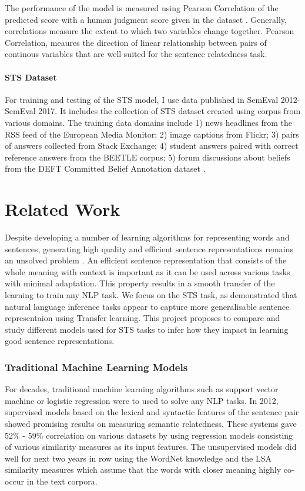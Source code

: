 \documentclass[12pt]{report} %
\begin{document}
The performance of the model is measured using Pearson Correlation of the predicted score with a human judgment score given in the dataset \citep{agirre2015semeval}. Generally, correlations measure the extent to which two variables change together. Pearson Correlation, meaures the direction of linear relationship between pairs of continous variables that are well suited for the sentence relatedness task.

\subsubsection{STS Dataset}

For training and testing of the STS model, I use data published in SemEval 2012-SemEval 2017. It includes the collection of STS dataset created using corpus from various domains. The training data domains include 1) news headlines from the RSS feed of the European Media Monitor; 2) image captions from Flickr; 3) pairs of answers collected from Stack Exchange; 4) student answers paired with correct reference answers from the BEETLE corpus; 5) forum discussions about beliefs from the DEFT Committed Belief Annotation dataset \citep{agirre2015semeval}. 


\chapter{Related Work}


Despite developing a number of learning algorithms for representing words and sentences, generating high quality and efficient sentence representations remains an unsolved problem \citep{conneau2017supervised}. An efficient sentence representation that consists of the whole meaning with context is important as it can be used across various tasks with minimal adaptation. This property results in a smooth transfer of the learning to train any NLP task. We focus on the STS task, as \cite{conneau2017supervised} demonstrated that natural language inference tasks appear to capture more generalisable sentence representaion using Transfer learning. This project proposes to compare and study different models used for STS tasks to infer how they impact in learning good sentence representations.

\subsection{Traditional Machine Learning Models}

For decades, traditional machine learning algorithms such as support vector machine or logistic regression were to used to solve any NLP tasks. In 2012, supervised models based on the lexical and syntactic features of the sentence pair showed promising results on measuring semantic relatedness. These systems gave 52\% - 59\% correlation on various datasets by using regression models consisting of various similarity measures as its input features. The unsupervised models did well for next two years in row using the WordNet knowledge and the LSA similarity measures which assume that the words with closer meaning highly co-occur in the text corpora. 
\end{document}
